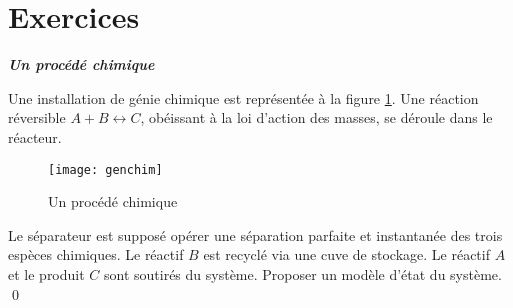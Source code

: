 \section{Exercices}

\begin{exercice}{\bf \em Un procédé chimique}

Une installation de génie chimique est représentée à la figure
\ref{Fig:genchim}. Une réaction réversible $A+B \leftrightarrow C$, obéissant
à la loi d'action des masses, se déroule dans le réacteur.
\begin{figure}[htbp] 
   \centering
   \texttt{[image: genchim]} 
   \caption{Un procédé chimique}
   \label{Fig:genchim}
\end{figure}
 Le séparateur est
supposé opérer une séparation parfaite et instantanée des trois
espèces chimiques. Le réactif $B$ est recyclé via une cuve de
stockage. Le réactif $A$ et le produit $C$ sont soutirés du système.
Proposer un modèle d'état du système. \qed
\end{exercice}
\vv

